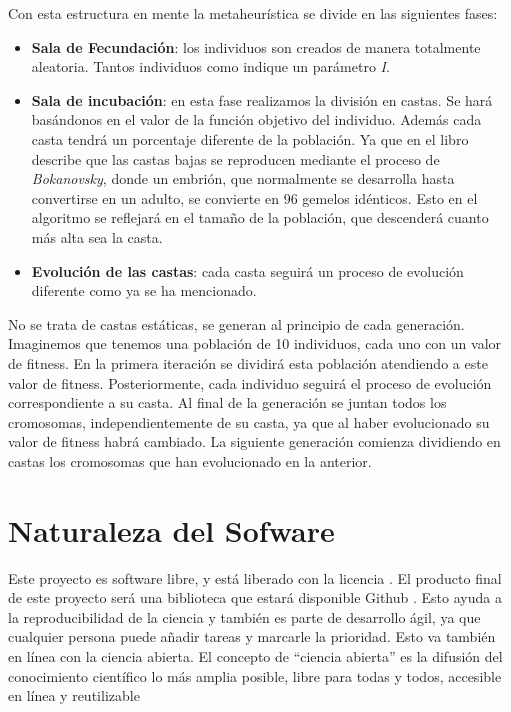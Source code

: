 Con esta estructura en mente la metaheurística se divide en las siguientes fases:

\begin{itemize}
    \item \textbf{Sala de Fecundación}: los individuos son creados de manera totalmente aleatoria. Tantos individuos
    como indique un parámetro \textit{I}.
    \item \textbf{Sala de incubación}: en esta fase realizamos la división en castas. Se hará basándonos en el valor de
    la función objetivo del individuo. Además cada casta tendrá un porcentaje diferente de la población. Ya que en el libro
    describe que las castas bajas se reproducen mediante el proceso de \textit{Bokanovsky}, donde un embrión, que normalmente 
    se desarrolla hasta convertirse en un adulto, se convierte en 96 gemelos idénticos. Esto en el algoritmo se reflejará 
    en el tamaño de la población, que descenderá cuanto más alta sea la casta.    
    \item \textbf{Evolución de las castas}: cada casta seguirá un proceso de evolución diferente como ya se 
    ha mencionado.
\end{itemize}

No se trata de castas estáticas, se generan al principio de cada generación. Imaginemos que tenemos una población de 10 individuos, cada 
uno con un valor de fitness. En la primera iteración se dividirá esta población atendiendo a este valor de fitness. Posteriormente,
cada individuo seguirá el proceso de evolución correspondiente a su casta. Al final de la generación se juntan todos los cromosomas,
independientemente de su casta, ya que al haber evolucionado su valor de fitness habrá cambiado. La siguiente generación comienza
dividiendo en castas los cromosomas que han evolucionado en la anterior.

\section{Naturaleza del Sofware}

Este proyecto es software libre, y está liberado con la licencia \cite{gplv3}. El producto final de este proyecto será una
biblioteca que estará disponible Github \cite{project_repository}. Esto ayuda a la reproducibilidad de la ciencia y 
también es parte de desarrollo ágil, ya que cualquier persona puede añadir tareas y marcarle la prioridad. Esto va 
también en línea con la ciencia abierta. El concepto de “ciencia abierta” es la difusión del conocimiento científico 
lo más amplia posible, libre para todas y todos, accesible en línea y reutilizable